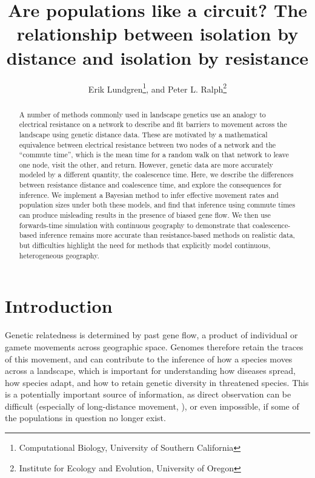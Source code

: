 \documentclass{article}
\begin{document}
\title{Are populations like a circuit? The relationship between isolation by distance and isolation by resistance}
\author{Erik Lundgren\footnote{Computational Biology, University of Southern California}, and
        Peter L. Ralph\footnote{Institute for Ecology and Evolution, University of Oregon}}
\maketitle

\begin{abstract}
A number of methods commonly used in landscape genetics
use an analogy to electrical resistance on a network
to describe and fit barriers to movement across the landscape
using genetic distance data.
These are motivated by a mathematical equivalence between electrical resistance 
between two nodes of a network
and the ``commute time'',
which is the mean time for a random walk on that network to leave one node, visit the other, and return.
However, genetic data are more accurately modeled by a different quantity,
the coalescence time.
Here, we describe the differences between resistance distance and coalescence time,
and explore the consequences for inference.
We implement a Bayesian method to infer effective movement rates and population sizes 
under both these models,
and find that inference using commute times
can produce misleading results in the presence of biased gene flow.
We then use forwards-time simulation with continuous geography to demonstrate that
coalescence-based inference remains more accurate than resistance-based methods on realistic data,
but difficulties highlight the need for methods 
that explicitly model continuous, heterogeneous geography.
\end{abstract}


\section*{Introduction}

Genetic relatedness is determined by past gene flow,
a product of individual or gamete movements across geographic space.
Genomes therefore retain the traces of this movement,
and can contribute to the inference of how a species moves across a landscape,
which is important for understanding how diseases spread, how species adapt,
and how to retain genetic diversity in threatened species.
This is a potentially important source of information,
as direct observation can be difficult 
(especially of long-distance movement, \citep{cayuelademographic,levin_et_al_seed_dispersal}),
or even impossible, if some of the populations in question no longer exist.
\end{document}
